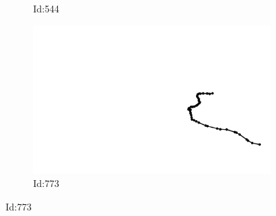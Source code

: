 \documentclass[12pt,twoside]{report}
\begin{document}
\begin{figure}
\begin{subfigure}[b]{0.20\textwidth}
\caption{Id:544}
\end{subfigure}
\begin{subfigure}[b]{0.20\textwidth}
\centering
\includegraphics[width=\textwidth]{../../trajectories/773.png}
\caption{Id:773}
\end{subfigure}
\end{figure}
\end{document}
